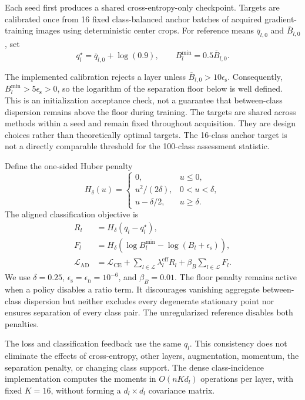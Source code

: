 \documentclass[a4paper,fleqn]{cas-dc}
\newcommand{\CE}{\mathcal{L}_{\mathrm{CE}}}
\newcommand{\AD}{\mathrm{AD}}
\newcommand{\epss}{\epsilon_{\mathrm{s}}}
\newcommand{\epsn}{\epsilon_{\mathrm{n}}}
\begin{document}
Each seed first produces a shared cross-entropy-only checkpoint.
Targets are calibrated once from 16 fixed class-balanced anchor
batches of acquired gradient-training images using deterministic
center crops. For reference means $\overline q_{l,0}$ and
$\overline B_{l,0}$, set
\begin{equation}
 q_l^\star=\overline q_{l,0}+\log(0.9),
 \qquad B_l^{\min}=0.5\overline B_{l,0}.
 \label{eq:targets}
\end{equation}

The implemented calibration rejects a layer unless
$\overline B_{l,0}>10\epss$. Consequently,
$B_l^{\min}>5\epss>0$, so the logarithm of the separation floor
below is well defined. This is an initialization acceptance check,
not a guarantee that between-class dispersion remains above the
floor during training. The targets are shared across methods within
a seed and remain fixed throughout acquisition. They are design
choices rather than theoretically optimal targets. The 16-class
anchor target is not a directly comparable threshold for the
100-class assessment statistic.

Define the one-sided Huber penalty
\begin{equation}
 H_\delta(u)=
 \begin{cases}
 0,&u\le0,\\
 u^2/(2\delta),&0<u<\delta,\\
 u-\delta/2,&u\ge\delta.
 \end{cases}
 \label{eq:huber}
\end{equation}
The aligned classification objective is
\begin{align}
 R_l&=H_\delta(q_l-q_l^\star),\\
 F_l&=H_\delta\!\left(
       \log B_l^{\min}-\log(B_l+\epss)\right),\\
 \mathcal L_{\AD}
 &=\CE+\sum_{l\in\mathcal L}\lambda_l^{\mathrm{eff}}R_l
       +\beta_B\sum_{l\in\mathcal L}F_l.
 \label{eq:aligned_loss}
\end{align}
We use $\delta=0.25$, $\epss=\epsn=10^{-6}$, and
$\beta_B=0.01$. The floor penalty remains active when a policy
disables a ratio term. It discourages vanishing aggregate
between-class dispersion but neither excludes every degenerate
stationary point nor ensures separation of every class pair.
The unregularized reference disables both penalties.

The loss and classification feedback use the same $q_l$.
This consistency does not eliminate the effects of cross-entropy,
other layers, augmentation, momentum, the separation penalty,
or changing class support. The dense class-incidence implementation
computes the moments in $O(nKd_l)$ operations per layer, with
fixed $K=16$, without forming a $d_l\times d_l$ covariance matrix.
\end{document}

